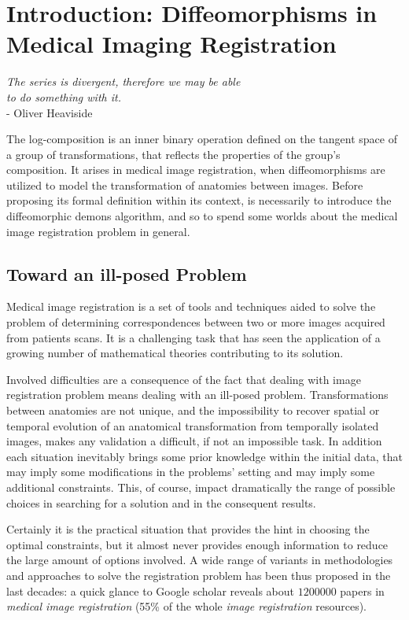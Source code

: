 \chapter{Introduction: Diffeomorphisms in Medical Imaging Registration}\label{ch:introduction}


\begin{flushright}
		\emph{The series is divergent, therefore we may be able \\ to do something with it.}\\
			- Oliver Heaviside
\end{flushright}

\vspace{0.6cm}


The log-composition is an inner binary operation defined on the tangent space of a group of transformations, that reflects the properties of the group's composition. It arises in medical image registration, when diffeomorphisms are utilized to model the transformation of anatomies between images. Before proposing its formal definition within its context, is necessarily to introduce the diffeomorphic demons algorithm, and so to spend some worlds about the medical image registration problem in general. 

\section{Toward an ill-posed Problem}
Medical image registration is a set of tools and techniques aided to solve the problem of determining correspondences between two or more images acquired from patients scans. It is a challenging task that has seen the application of a growing number of mathematical theories contributing to its solution.

Involved difficulties are a consequence of the fact that dealing with image registration problem means dealing with an ill-posed problem. Transformations between anatomies are not unique, and the impossibility to recover spatial or temporal evolution of an anatomical transformation from temporally isolated images, makes any validation a difficult, if not an impossible task. 
In addition each situation inevitably brings some prior knowledge within the initial data, that may imply some modifications in the problems' setting and may imply some additional constraints. This, of course, impact dramatically the range of possible choices in searching for a solution and in the consequent results. 

Certainly it is the practical situation that provides the hint in choosing the optimal constraints, but it almost never provides enough information to reduce the large amount of options involved. A wide range of variants in methodologies and approaches to solve the registration problem has been thus proposed in the last decades: a quick glance to Google scholar reveals about $1200000$ papers in \emph{medical image registration} (55\% of the whole \emph{image registration} resources). 

